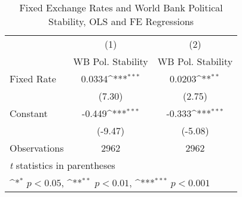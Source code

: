 \begin{table}[htbp]\centering
\def\sym#1{\ifmmode^{#1}\else\(^{#1}\)\fi}
\caption{Fixed Exchange Rates and World Bank Political Stability, OLS and FE Regressions \label{WBratesalone}}
\begin{tabular}{l*{2}{c}}
\toprule
                                        &\multicolumn{1}{c}{(1)}&\multicolumn{1}{c}{(2)}\\
                                        &\multicolumn{1}{c}{WB Pol. Stability}&\multicolumn{1}{c}{WB Pol. Stability}\\
\midrule
Fixed Rate                              &   0.0334\sym{***}&   0.0203\sym{**} \\
                                        &   (7.30)         &   (2.75)         \\
\addlinespace
Constant                                &   -0.449\sym{***}&   -0.333\sym{***}\\
                                        &  (-9.47)         &  (-5.08)         \\
\midrule
Observations                            &     2962         &     2962         \\
\bottomrule
\multicolumn{3}{l}{\footnotesize \textit{t} statistics in parentheses}\\
\multicolumn{3}{l}{\footnotesize \sym{*} \(p<0.05\), \sym{**} \(p<0.01\), \sym{***} \(p<0.001\)}\\
\end{tabular}
\end{table}
